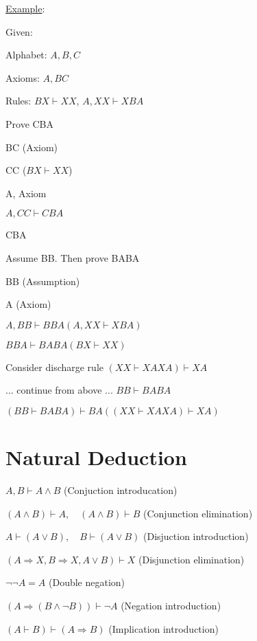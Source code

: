 \documentclass[12pt]{article}
\begin{document}
\begin{spacing}{1.5}
\underline{Example}: 

Given:

\begin{itemize*}
	\item Alphabet: ${A, B, C}$
	\item Axioms: $A, BC$
	\item Rules: $BX \vdash XX$, $A,XX \vdash XBA$
\end{itemize*}

Prove CBA

\begin{itemize*}
	\item BC (Axiom)
	\item CC ($BX \vdash XX$)
	\item A, Axiom
	\item $A, CC \vdash CBA$
	\item CBA
\end{itemize*}

Assume BB. Then prove BABA

\begin{itemize*}
	\item BB (Assumption)
		\begin{itemize*}
			\item A (Axiom)
			\item $A, BB \vdash BBA (A,XX \vdash XBA)$
			\item $BBA \vdash BABA (BX \vdash XX)$
		\end{itemize*}
\end{itemize*}

Consider discharge rule $(XX \vdash XAXA) \vdash XA$

\begin{itemize*}
	\item ... continue from above ... $BB \vdash BABA$
	\item $(BB \vdash BABA) \vdash BA ((XX \vdash XAXA) \vdash XA)$
\end{itemize*}

\section{Natural Deduction}

\begin{itemize*}
	\item $A, B \vdash A \wedge B$ \qquad (Conjuction introducation)
	\item $(A \wedge B) \vdash A, \quad (A \wedge B) \vdash B$ \qquad (Conjunction elimination)
	\item $A \vdash (A \vee B), \quad B \vdash (A \vee B)$ \qquad (Disjuction introduction)
	\item $(A \Rightarrow X, B \Rightarrow X, A \vee B) \vdash X$ \qquad (Disjunction elimination)
	\item $\neg \neg A = A$ \qquad (Double negation)
	\item $(A \Rightarrow (B \wedge \neg B)) \vdash \neg A$ \qquad (Negation introduction)
	\item $(A \vdash B) \vdash (A \Rightarrow B)$ \qquad (Implication introduction)
\end{itemize*}


\end{spacing}
\end{document}
